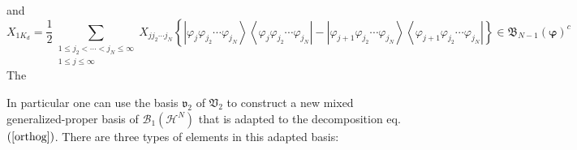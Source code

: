 \documentclass[aps,preprint]{revtex4}%
\begin{document}
and
\begin{equation}
X_{1K_{d}}=\frac{1}{2}\sum_{\substack{1\leq j_{2}<\cdots<j_{N}\leq
\infty\\1\leq j\leq\infty}}X_{jj_{2}\cdots j_{N}}\left\{  \left\vert
\varphi_{j}\varphi_{j_{2}}\cdots\varphi_{j_{N}}\right\rangle \left\langle
\varphi_{j}\varphi_{j_{2}}\cdots\varphi_{j_{N}}\right\vert -\left\vert
\varphi_{j+1}\varphi_{j_{2}}\cdots\varphi_{j_{N}}\right\rangle \left\langle
\varphi_{j+1}\varphi_{j_{2}}\cdots\varphi_{j_{N}}\right\vert \right\}
\in\mathfrak{B}_{N-1}\left(  \mathbf{\varphi}\right)  ^{c}%
\end{equation}
The

In particular one can use the basis $\mathfrak{v}_{2}$ of $\mathfrak{V}_{2}$
to construct a new mixed generalized-proper basis of $\mathcal{B}_{1}\left(
\mathcal{H}^{N}\right)  $ that is adapted to the decomposition eq. $\left(
\ref{orthog}\right)  $. There are three types of elements in this adapted basis:
\end{document}
